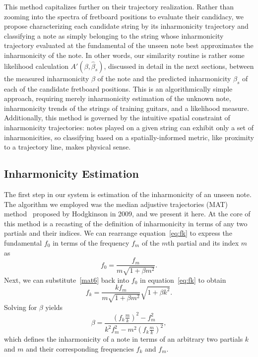 \documentclass[12pt]{cmuthesis}
\begin{document}
This method capitalizes further on their trajectory realization. Rather than zooming into the spectra of fretboard positions to evaluate their candidacy, we propose characterizing each candidate string by its inharmonicity trajectory and classifying a note as simply belonging to the string whose inharmonicity trajectory evaluated at the fundamental of the unseen note best approximates the inharmonicity of the note. In other words, our similarity routine is rather some likelihood calculation $A'(\beta,\hat{\beta}_s)$, discussed in detail in the next sections, between the measured inharmonicity $\beta$ of the note and the predicted inharmonicity $\hat{\beta}_s$ of each of the candidate fretboard positions. This is an algorithmically simple approach, requiring merely inharmonicity estimation of the unknown note, inharmonicity trends of the strings of training guitars, and a likelihood measure. Additionally, this method is governed by the intuitive spatial constraint of inharmonicity trajectories: notes played on a given string can exhibit only a set of inharmonicities, so classifying based on a spatially-informed metric, like proximity to a trajectory line, makes physical sense.

\subsection{Inharmonicity Estimation}
\label{mat}
The first step in our system is estimation of the inharmonicity of an unseen note. The algorithm we employed was the median adjustive trajectories (MAT) method~\cite{hodgkinson2009} proposed by Hodgkinson in 2009, and we present it here. At the core of this method is a recasting of the definition of inharmonicity in terms of any two partials and their indices. We can rearrange equation~\eqref{eq:fk} to express the fundamental $f_0$ in terms of the frequency $f_m$ of the $m$th partial and its index $m$ as
\begin{equation}
\label{mat6}
f_0 = \frac{f_m}{m\sqrt{1+\beta m^2}}.
\end{equation}
Next, we can substitute~\eqref{mat6} back into $f_0$ in equation~\eqref{eq:fk} to obtain
\begin{equation}
\label{mat7}
f_k = \frac{kf_m}{m\sqrt{1+\beta m^2}}\sqrt{1+\beta k^2}.
\end{equation}
Solving for $\beta$ yields
\begin{equation}
\label{mat8}
\beta = \frac{(f_k\frac{m}{k})^2-f_m^2}{k^2f_m^2-m^2(f_k\frac{m}{k})^2},
\end{equation}
which defines the inharmonicity of a note in terms of an arbitrary two partials $k$ and $m$ and their corresponding frequencies $f_k$ and $f_m$.
\end{document}
